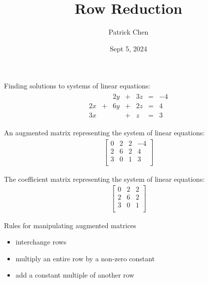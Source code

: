 \documentclass{article}
\title{Row Reduction}
\author{Patrick Chen}
\date{Sept 5, 2024}
\theoremstyle{mytheoremstyle}
\theoremstyle{mytheoremstyle}
\theoremstyle{myproblemstyle}
\begin{document}
    \maketitle

    Finding solutions to systems of linear equations:
    \begin{align*}
        \begin{matrix}
               & & 2y &+& 3z &=& -4 \\
            2x &+& 6y &+& 2z &=& 4 \\
            3x & &    &+& z  &=& 3
        \end{matrix}
    \end{align*}

    An augmented matrix representing the system of linear equations:
    \begin{align*}
        \begin{bmatrix}
            0 & 2 & 2 & -4 \\
            2 & 6 & 2 & 4 \\
            3 & 0 & 1 & 3 \\
        \end{bmatrix}
    \end{align*}

    The coefficient matrix representing the system of linear equations:
    \begin{align*}
        \begin{bmatrix}
            0 & 2 & 2  \\
            2 & 6 & 2  \\
            3 & 0 & 1  \\
        \end{bmatrix}
    \end{align*}

    Rules for manipulating augmented matrices
    \begin{itemize}
        \item interchange rows
        \item multiply an entire row by a non-zero constant
        \item add a constant multiple of another row
    \end{itemize}
\end{document}
